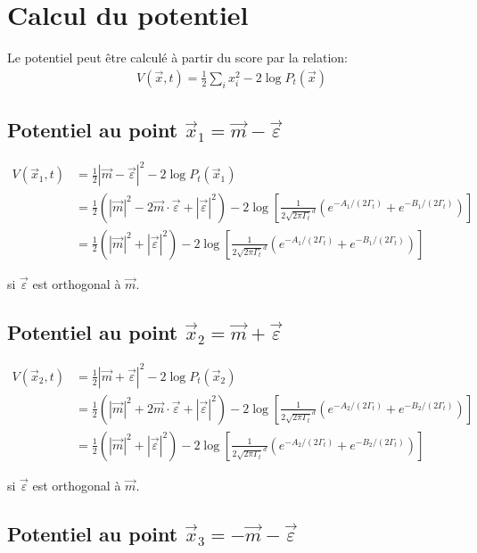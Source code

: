 \documentclass[11pt,a4paper]{article}
\begin{document}
\section{Calcul du potentiel}

Le potentiel peut être calculé à partir du score par la relation:
\begin{align}
V(\vec{x}, t) = \frac{1}{2}\sum_i x_i^2 - 2\log P_t(\vec{x})
\end{align}

\subsection{Potentiel au point $\vec{x}_1 = \vec{m} - \vec{\varepsilon}$}

\begin{align}
V(\vec{x}_1, t) &= \frac{1}{2}|\vec{m} - \vec{\varepsilon}|^2 - 2\log P_t(\vec{x}_1) \\
&= \frac{1}{2}(|\vec{m}|^2 - 2\vec{m}\cdot\vec{\varepsilon} + |\vec{\varepsilon}|^2) - 2\log\left[\frac{1}{2\sqrt{2\pi\Gamma_t}^d}\left(e^{-A_1/(2\Gamma_t)} + e^{-B_1/(2\Gamma_t)}\right)\right] \\
&= \frac{1}{2}(|\vec{m}|^2 + |\vec{\varepsilon}|^2) - 2\log\left[\frac{1}{2\sqrt{2\pi\Gamma_t}^d}\left(e^{-A_1/(2\Gamma_t)} + e^{-B_1/(2\Gamma_t)}\right)\right]
\end{align}

si $\vec{\varepsilon}$ est orthogonal à $\vec{m}$.

\subsection{Potentiel au point $\vec{x}_2 = \vec{m} + \vec{\varepsilon}$}

\begin{align}
V(\vec{x}_2, t) &= \frac{1}{2}|\vec{m} + \vec{\varepsilon}|^2 - 2\log P_t(\vec{x}_2) \\
&= \frac{1}{2}(|\vec{m}|^2 + 2\vec{m}\cdot\vec{\varepsilon} + |\vec{\varepsilon}|^2) - 2\log\left[\frac{1}{2\sqrt{2\pi\Gamma_t}^d}\left(e^{-A_2/(2\Gamma_t)} + e^{-B_2/(2\Gamma_t)}\right)\right] \\
&= \frac{1}{2}(|\vec{m}|^2 + |\vec{\varepsilon}|^2) - 2\log\left[\frac{1}{2\sqrt{2\pi\Gamma_t}^d}\left(e^{-A_2/(2\Gamma_t)} + e^{-B_2/(2\Gamma_t)}\right)\right]
\end{align}

si $\vec{\varepsilon}$ est orthogonal à $\vec{m}$.

\subsection{Potentiel au point $\vec{x}_3 = -\vec{m} - \vec{\varepsilon}$}
\end{document}
